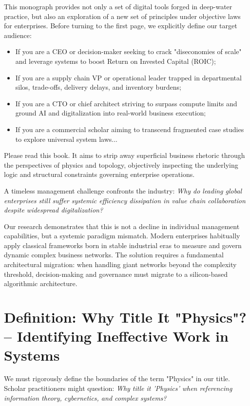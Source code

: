 \documentclass[12pt,a4paper,oneside]{book}
\begin{document}
This monograph provides not only a set of digital tools forged in deep-water practice, but also an exploration of a new set of principles under objective laws for enterprises. Before turning to the first page, we explicitly define our target audience:
\begin{itemize}
    \item If you are a CEO or decision-maker seeking to crack "diseconomies of scale" and leverage systems to boost Return on Invested Capital (ROIC);
    \item If you are a supply chain VP or operational leader trapped in departmental silos, trade-offs, delivery delays, and inventory burdens;
    \item If you are a CTO or chief architect striving to surpass compute limits and ground AI and digitalization into real-world business execution;
    \item If you are a commercial scholar aiming to transcend fragmented case studies to explore universal system laws...
\end{itemize}

Please read this book. It aims to strip away superficial business rhetoric through the perspectives of physics and topology, objectively inspecting the underlying logic and structural constraints governing enterprise operations.

A timeless management challenge confronts the industry: \textit{Why do leading global enterprises still suffer systemic efficiency dissipation in value chain collaboration despite widespread digitalization?}

Our research demonstrates that this is not a decline in individual management capabilities, but a systemic paradigm mismatch. Modern enterprises habitually apply classical frameworks born in stable industrial eras to measure and govern dynamic complex business networks. The solution requires a fundamental architectural migration: when handling giant networks beyond the complexity threshold, decision-making and governance must migrate to a silicon-based algorithmic architecture.

\section*{Definition: Why Title It "Physics"? -- Identifying Ineffective Work in Systems}
We must rigorously define the boundaries of the term "Physics" in our title. Scholar practitioners might question: \textit{Why title it 'Physics' when referencing information theory, cybernetics, and complex systems?}
\end{document}
